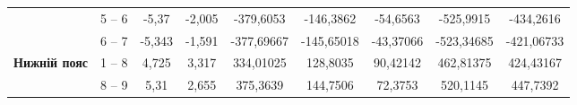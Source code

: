 \documentclass[a4paper,14pt]{article}
\begin{document}
\begin{landscape}
\begin{center}
\begin{table}[]
\begin{tabular}{|c|c|c|c|c|c|c|c|c|}
                                             & 5 – 6                                & -5,37                                                                             & -2,005                                                                           & -379,6053                                                                                                        & -146,3862                                                                          & -54,6563                                                                           & -525,9915                     & -434,2616                     \\ \cline{2-9} 
                                             & 6 – 7                                & -5,343                                                                            & -1,591                                                                           & -377,69667                                                                                                       & -145,65018                                                                         & -43,37066                                                                          & -523,34685                    & -421,06733                    \\ \hline
    \multirow{3}{*}{\textbf{Нижній пояс}}    & 1 – 8                                & 4,725                                                                             & 3,317                                                                            & 334,01025                                                                                                        & 128,8035                                                                           & 90,42142                                                                           & 462,81375                     & 424,43167                     \\ \cline{2-9} 
                                             & 8 – 9                                & 5,31                                                                              & 2,655                                                                            & 375,3639                                                                                                         & 144,7506                                                                           & 72,3753                                                                            & 520,1145                      & 447,7392                      \\ \cline{2-9} 

\end{tabular}
\end{table}
\end{center}
\end{landscape}
\end{document}

